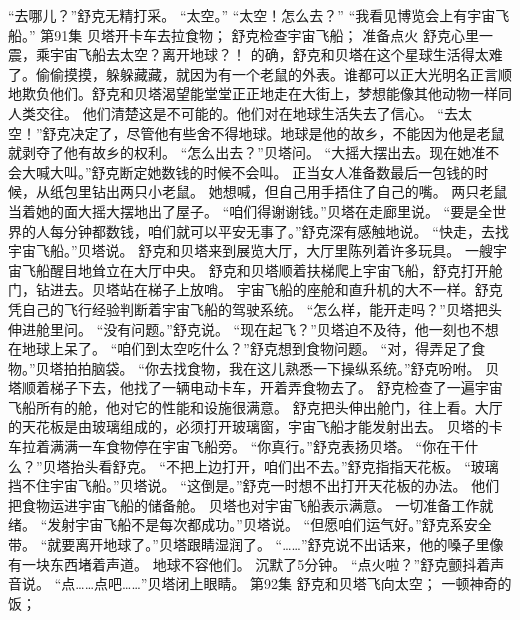 \documentclass[a4paper,12pt,UTF8,twoside]{ctexbook}
\begin{document}
        “去哪儿？”舒克无精打采。 
        “太空。” 
        “太空！怎么去？” 
        “我看见博览会上有宇宙飞船。”   第91集 
        贝塔开卡车去拉食物； 
        舒克检查宇宙飞船； 
        准备点火   
        舒克心里一震，乘宇宙飞船去太空？离开地球？！ 
        的确，舒克和贝塔在这个星球生活得太难了。偷偷摸摸，躲躲藏藏，就因为有一个老鼠的外表。谁都可以正大光明名正言顺地欺负他们。舒克和贝塔渴望能堂堂正正地走在大街上，梦想能像其他动物一样同人类交往。 
        他们清楚这是不可能的。他们对在地球生活失去了信心。 
        “去太空！”舒克决定了，尽管他有些舍不得地球。地球是他的故乡，不能因为他是老鼠就剥夺了他有故乡的权利。 
        “怎么出去？”贝塔问。 
        “大摇大摆出去。现在她准不会大喊大叫。”舒克断定她数钱的时候不会叫。 
        正当女人准备数最后一包钱的时候，从纸包里钻出两只小老鼠。 
        她想喊，但自己用手捂住了自己的嘴。 
        两只老鼠当着她的面大摇大摆地出了屋子。 
        “咱们得谢谢钱。”贝塔在走廊里说。 
        “要是全世界的人每分钟都数钱，咱们就可以平安无事了。”舒克深有感触地说。 
        “快走，去找宇宙飞船。”贝塔说。 
        舒克和贝塔来到展览大厅，大厅里陈列着许多玩具。 
        一艘宇宙飞船醒目地耸立在大厅中央。 
        舒克和贝塔顺着扶梯爬上宇宙飞船，舒克打开舱门，钻进去。贝塔站在梯子上放哨。 
        宇宙飞船的座舱和直升机的大不一样。舒克凭自己的飞行经验判断着宇宙飞船的驾驶系统。 
        “怎么样，能开走吗？”贝塔把头伸进舱里问。 
        “没有问题。”舒克说。 
        “现在起飞？”贝塔迫不及待，他一刻也不想在地球上呆了。 
        “咱们到太空吃什么？”舒克想到食物问题。 
        “对，得弄足了食物。”贝塔拍拍脑袋。 
        “你去找食物，我在这儿熟悉一下操纵系统。”舒克吩咐。 
        贝塔顺着梯子下去，他找了一辆电动卡车，开着弄食物去了。 
        舒克检查了一遍宇宙飞船所有的舱，他对它的性能和设施很满意。 
        舒克把头伸出舱门，往上看。大厅的天花板是由玻璃组成的，必须打开玻璃窗，宇宙飞船才能发射出去。 
        贝塔的卡车拉着满满一车食物停在宇宙飞船旁。 
        “你真行。”舒克表扬贝塔。 
        “你在干什么？”贝塔抬头看舒克。 
        “不把上边打开，咱们出不去。”舒克指指天花板。 
        “玻璃挡不住宇宙飞船。”贝塔说。 
        “这倒是。”舒克一时想不出打开天花板的办法。 
        他们把食物运进宇宙飞船的储备舱。 
        贝塔也对宇宙飞船表示满意。 
        一切准备工作就绪。 
        “发射宇宙飞船不是每次都成功。”贝塔说。 
        “但愿咱们运气好。”舒克系安全带。 
        “就要离开地球了。”贝塔跟睛湿润了。 
        “……”舒克说不出话来，他的嗓子里像有一块东西堵着声道。 
        地球不容他们。 
         沉默了5分钟。 
        “点火啦？”舒克颤抖着声音说。 
        “点……点吧……”贝塔闭上眼睛。   第92集 
        舒克和贝塔飞向太空； 
        一顿神奇的饭； 
\end{document}
